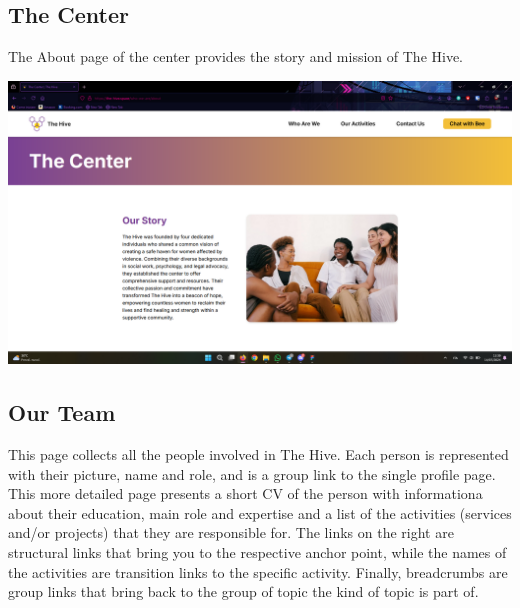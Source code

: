 \subsection{The Center}
The About page of the center provides the story and mission of The Hive.
\vspace{1em}
\begin{center}
    \includegraphics[width=0.5\linewidth]{img/design-document/website-screenshots/centerpage.png}   
\end{center}

\subsection{Our Team}
This page collects all the people involved in The Hive. Each person is represented with their picture, name and role,
and is a group link to the single profile page. This more detailed page presents a short CV of the person with informationa
about their education, main role and expertise and a list of the activities (services and/or projects) that they are responsible for.
The links on the right are structural links that bring you to the respective anchor point, while the names of the activities 
are transition links to the specific activity. Finally, breadcrumbs are group links that bring back to the group of topic the kind of topic is part of.

